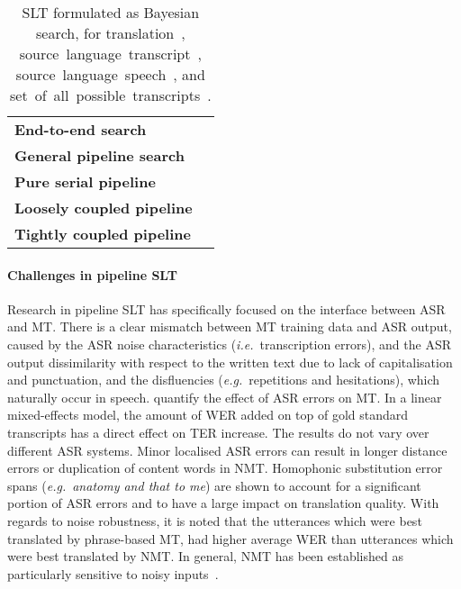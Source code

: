 \documentclass{svjour3}
\newcommand{\ie}[1]{\textit{i.e.}~#1}
\newcommand{\eg}[1]{\textit{e.g.}~#1}
\begin{document}
\begin{table}[t]
    \centering
    \caption{SLT formulated as Bayesian search, for \mbox{translation }, \mbox{source language transcript }, \mbox{source language speech }, and \mbox{set of all possible transcripts }.}
    \label{tab:pipeline-slt-search}
    {\renewcommand{\arraystretch}{2}\begin{tabular}{ll@{}}
    \toprule
        \textbf{End-to-end search}          &  \\
        \textbf{General pipeline search}    &  \\
        \textbf{Pure serial pipeline}       &  \\
        \textbf{Loosely coupled pipeline}   &  \\
        \textbf{Tightly coupled pipeline}   &  \\
    \bottomrule
    \end{tabular}
    }
\end{table}


\paragraph{\textbf{Challenges in pipeline SLT}}


Research in pipeline SLT has specifically focused on the interface between ASR and MT. There is a clear mismatch between MT training data and ASR output, caused by the ASR noise characteristics (\ie transcription errors), and the ASR output dissimilarity with respect to the written text due to lack of capitalisation and punctuation, and the disfluencies (\eg repetitions and hesitations), which naturally occur in speech.
\citet{ruiz2014assessing,ruiz2015phonetically,ruiz2017assessing}
quantify the effect of ASR errors on MT. In a linear mixed-effects model, the amount of WER added on top of gold standard transcripts has a direct effect on TER increase. The results do not vary over different ASR systems. Minor localised ASR errors can result in longer distance errors or duplication of content words in NMT. Homophonic substitution error spans (\eg \textit{anatomy  and that to me}) are shown to account for a significant portion of ASR errors and to have a large impact on translation quality.
With regards to noise robustness, it is noted that the utterances which were best translated by phrase-based MT, had higher average WER than utterances which were best translated by NMT. In general, NMT has been established as particularly sensitive to noisy inputs~\citep{belinkov2018synthetic,cheng-etal-2018-towards}.
\end{document}
